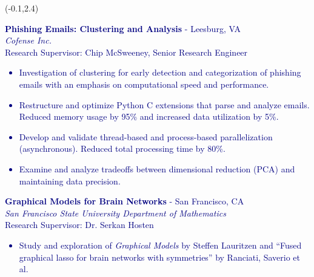 \documentclass[hidelinks, 10pt]{article}
\newcommand{\bodyspacing}{1mm}
\begin{document}
\begin{textblock}{9}(-0.1,2.4)
\setlength{\parindent}{0cm}
\small
\vspace{5mm}

\textcolor{navy}{\textbf{Phishing Emails: Clustering and Analysis} - Leesburg, VA\\
\emph{Cofense Inc.}\\
Research Supervisor: Chip McSweeney, Senior Research Engineer
	\makeatletter
	\def\@listi{\orig@listi\topsep=0.3\baselineskip}
	\makeatother
    \begin{itemize}[leftmargin=5mm]
    	\setlength\itemsep{-0.25em}
    	\item Investigation of clustering for early detection and
    	categorization of phishing emails with an emphasis on computational speed and
    	performance.
		\item Restructure and optimize Python C extensions that parse and
		analyze emails.  Reduced memory usage by 95\% and increased data
		utilization by 5\%.
		\item Develop and validate thread-based and process-based
		parallelization (asynchronous).  Reduced total processing time by 80\%.
		\item Examine and analyze tradeoffs between dimensional reduction (PCA) and
		maintaining data precision.
    \end{itemize}}

\vspace{\bodyspacing}

\textcolor{navy}{{\textbf{Graphical Models for Brain Networks} - San Francisco, CA}\\
\emph{San Francisco State University Department of Mathematics}\\
Research Supervisor: Dr. Serkan Hosten
    \begin{itemize}[leftmargin=5mm]
    	\setlength\itemsep{-0.25em}
    	\item Study and exploration of \emph{Graphical Models} by Steffen
    	Lauritzen and ``Fused graphical lasso for brain networks with
    	symmetries'' by Ranciati, Saverio et al.
    \end{itemize}}

\vspace{4mm}



\end{textblock}
\end{document}
